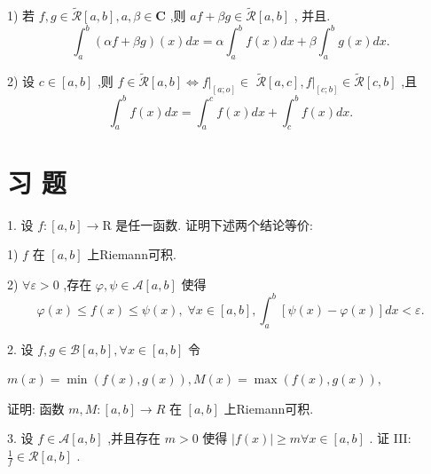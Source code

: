 1) 若 $f,g \in  \widetilde{\mathcal{R}}\left\lbrack  {a,b}\right\rbrack  ,a,\beta  \in  \mathbf{C}$ ,则 ${af} + {\beta g} \in  \widetilde{\mathcal{R}}\left\lbrack  {a,b}\right\rbrack$ , 并且.
$${\int }_{a}^{b}\left( {{\alpha f} + {\beta g}}\right) \left( x\right) {dx} = \alpha {\int }_{a}^{b}f\left( x\right) {dx} + \beta {\int }_{a}^{b}g\left( x\right) {dx}.$$

2) 设 $c \in  \left\lbrack  {a,b}\right\rbrack$ ,则 $f \in  \widetilde{\mathcal{R}}\left\lbrack  {a,b}\right\rbrack   \Leftrightarrow  {\left. f\right| }_{\left\lbrack  a;o\right\rbrack  } \in$  $\widetilde{\mathcal{R}}\left\lbrack  {a,c}\right\rbrack  ,{\left. f\right| }_{\left\lbrack  c;b\right\rbrack  } \in  \widetilde{\mathcal{R}}\left\lbrack  {c,b}\right\rbrack$ ,且
$${\int }_{a}^{b}f\left( x\right) {dx} = {\int }_{a}^{c}f\left( x\right) {dx} + {\int }_{c}^{b}f\left( x\right) {dx}.$$

\section*{习 题}

1. 设 $f : \left\lbrack  {a,b}\right\rbrack   \rightarrow  \mathrm{R}$ 是任一函数. 证明下述两个结论等价:

1) $f$ 在 $\left\lbrack  {a,b}\right\rbrack$ 上Riemann可积.

2) $\forall \varepsilon  > 0$ ,存在 $\varphi ,\psi  \in  \mathcal{A}\left\lbrack  {a,b}\right\rbrack$ 使得
$$\varphi \left( x\right)  \leq  f\left( x\right)  \leq  \psi \left( x\right) ,\;\forall x \in  \left\lbrack  {a,b}\right\rbrack  ,{\int }_{a}^{b}\left\lbrack  {\psi \left( x\right)  - \varphi \left( x\right) }\right\rbrack  {dx} < \varepsilon .$$

2. 设 $f,g \in  \mathcal{B}\left\lbrack  {a,b}\right\rbrack  ,\forall x \in  \left\lbrack  {a,b}\right\rbrack$ 令

$m\left( x\right)  = \min \left( {f\left( x\right) ,g\left( x\right) }\right) ,M\left( x\right)  = \max \left( {f\left( x\right) ,g\left( x\right) }\right) ,$

证明: 函数 $m,M : \left\lbrack  {a,b}\right\rbrack   \rightarrow  R$ 在 $\left\lbrack  {a,b}\right\rbrack$ 上Riemann可积.

3. 设 $f \in  \mathcal{A}\left\lbrack  {a,b}\right\rbrack$ ,并且存在 $m > 0$ 使得 $\left| {f\left( x\right) }\right|  \geq  m\forall x \in  \left\lbrack  {a,b}\right\rbrack$ . 证 III: $\frac{1}{f} \in  \mathcal{R}\left\lbrack  {a,b}\right\rbrack$ .

